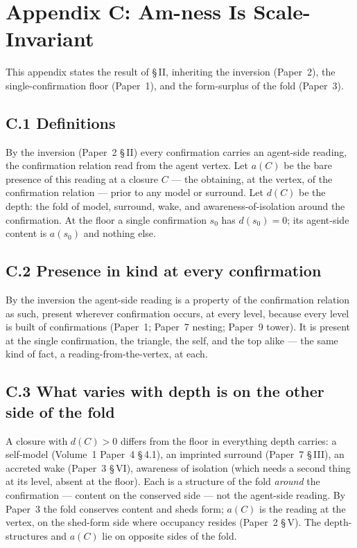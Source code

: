 \documentclass[11pt,oneside]{report}
\theoremstyle{definition}
\theoremstyle{remark}
\begin{document}
\section*{Appendix C: Am-ness Is Scale-Invariant}

This appendix states the result of \S\,II, inheriting the inversion (Paper~2), the single-confirmation floor (Paper~1), and the form-surplus of the fold (Paper~3).

\subsection*{C.1 Definitions}

By the inversion (Paper~2 \S\,II) every confirmation carries an agent-side reading, the confirmation relation read from the agent vertex. Let \ensuremath{a(C)} be the bare presence of this reading at a closure \ensuremath{C} --- the obtaining, at the vertex, of the confirmation relation --- prior to any model or surround. Let \ensuremath{d(C)} be the depth: the fold of model, surround, wake, and awareness-of-isolation around the confirmation. At the floor a single confirmation \ensuremath{s_0} has \ensuremath{d(s_0) = 0}; its agent-side content is \ensuremath{a(s_0)} and nothing else.

\subsection*{C.2 Presence in kind at every confirmation}

By the inversion the agent-side reading is a property of the confirmation relation as such, present wherever confirmation occurs, at every level, because every level is built of confirmations (Paper~1; Paper~7 nesting; Paper~9 tower). It is present at the single confirmation, the triangle, the self, and the top alike --- the same kind of fact, a reading-from-the-vertex, at each.

\subsection*{C.3 What varies with depth is on the other side of the fold}

A closure with \ensuremath{d(C) > 0} differs from the floor in everything depth carries: a self-model (Volume~1 Paper~4 \S\,4.1), an imprinted surround (Paper~7 \S\,III), an accreted wake (Paper~3 \S\,VI), awareness of isolation (which needs a second thing at its level, absent at the floor). Each is a structure of the fold \emph{around} the confirmation --- content on the conserved side --- not the agent-side reading. By Paper~3 the fold conserves content and sheds form; \ensuremath{a(C)} is the reading at the vertex, on the shed-form side where occupancy resides (Paper~2 \S\,V). The depth-structures and \ensuremath{a(C)} lie on opposite sides of the fold.
\end{document}
